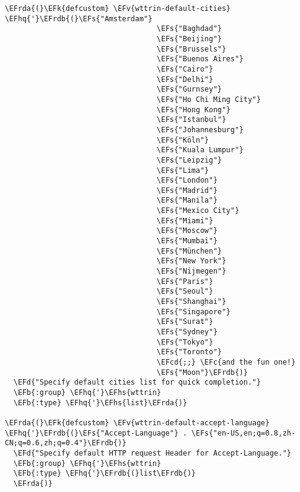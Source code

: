 \documentclass[a4wide,10pt]{article}
\newcommand{\EFc}[1]{\textcolor{EFc}{#1}} %
\newcommand{\EFcd}[1]{\textcolor{EFcd}{#1}} %
\newcommand{\EFs}[1]{\textcolor{EFs}{#1}} %
\newcommand{\EFd}[1]{\textcolor{EFd}{#1}} %
\newcommand{\EFk}[1]{\textcolor{EFk}{#1}} %
\newcommand{\EFb}[1]{\textcolor{EFb}{#1}} %
\newcommand{\EFv}[1]{\textcolor{EFv}{#1}} %
\newcommand{\EFhq}[1]{\textcolor{EFhq}{#1}} %
\newcommand{\EFhs}[1]{\textcolor{EFhs}{#1}} %
\newcommand{\EFrda}[1]{\textcolor{EFrda}{#1}} %
\newcommand{\EFrdb}[1]{\textcolor{EFrdb}{#1}} %
\begin{document}
\begin{Code}
\begin{Verbatim}
\EFrda{(}\EFk{defcustom} \EFv{wttrin-default-cities} \EFhq{'}\EFrdb{(}\EFs{"Amsterdam"}
                                   \EFs{"Baghdad"}
                                   \EFs{"Beijing"}
                                   \EFs{"Brussels"}
                                   \EFs{"Buenos Aires"}
                                   \EFs{"Cairo"}
                                   \EFs{"Delhi"}
                                   \EFs{"Gurnsey"}
                                   \EFs{"Ho Chi Ming City"}
                                   \EFs{"Hong Kong"}
                                   \EFs{"Istanbul"}
                                   \EFs{"Johannesburg"}
                                   \EFs{"Köln"}
                                   \EFs{"Kuala Lumpur"}
                                   \EFs{"Leipzig"}
                                   \EFs{"Lima"}
                                   \EFs{"London"}
                                   \EFs{"Madrid"}
                                   \EFs{"Manila"}
                                   \EFs{"Mexico City"}
                                   \EFs{"Miami"}
                                   \EFs{"Moscow"}
                                   \EFs{"Mumbai"}
                                   \EFs{"München"}
                                   \EFs{"New York"}
                                   \EFs{"Nijmegen"}
                                   \EFs{"Paris"}
                                   \EFs{"Seoul"}
                                   \EFs{"Shanghai"}
                                   \EFs{"Singapore"}
                                   \EFs{"Surat"}
                                   \EFs{"Sydney"}
                                   \EFs{"Tokyo"}
                                   \EFs{"Toronto"}
                                   \EFcd{;;} \EFc{and the fun one!}
                                   \EFs{"Moon"}\EFrdb{)}
  \EFd{"Specify default cities list for quick completion."}
  \EFb{:group} \EFhq{'}\EFhs{wttrin}
  \EFb{:type} \EFhq{'}\EFhs{list}\EFrda{)}

\EFrda{(}\EFk{defcustom} \EFv{wttrin-default-accept-language} \EFhq{'}\EFrdb{(}\EFs{"Accept-Language"} . \EFs{"en-US,en;q=0.8,zh-CN;q=0.6,zh;q=0.4"}\EFrdb{)}
  \EFd{"Specify default HTTP request Header for Accept-Language."}
  \EFb{:group} \EFhq{'}\EFhs{wttrin}
  \EFb{:type} \EFhq{'}\EFrdb{(}list\EFrdb{)}
  \EFrda{)}


\end{Verbatim}
\end{Code}
\end{document}

